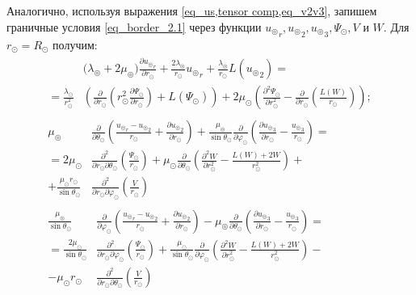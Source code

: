 Аналогично, используя выражения \cref{eq_us,tensor comp,eq_v2v3}, запишем граничные условия \cref{eq_border_2.1} через функции ${u_\circledcirc}_r, {u_\circledcirc}_2, {u_\circledcirc}_3, \Psi_\odot, V$ и $W.$ Для $r_\odot = R_\odot$ получим:
\begin{align}
\begin{split}
&\biggl(\lambda_\circledcirc+2\mu_\circledcirc\biggr)\frac{\partial {u_\circledcirc}_r}{\partial r_\odot} + \frac{2\lambda_\circledcirc}{r_\odot}{u_\circledcirc}_r + \frac{\lambda_\circledcirc}{r_\odot}L({u_\circledcirc}_2) = \\
= \frac{\lambda_\odot}{r_\odot^2}&\left(\frac{\partial}{\partial r_\odot}\left(r_\odot^2\frac{\partial\Psi_\odot}{\partial r_\odot}\right)+L(\Psi_\odot)\right) + 2\mu_\odot\left(\frac{\partial^2 \Psi_\odot}{\partial r_\odot^2} - \frac{\partial}{\partial r_\odot}\left(\frac{L(W)}{r_\odot}\right)\right);
\end{split}\label{eq_Rs.1}\\
\begin{split}
\mu_\circledcirc&\frac{\partial}{\partial \theta_\odot}\left(\frac{{u_\circledcirc}_r-{u_\circledcirc}_2}{r_\odot} + \frac{\partial {u_\circledcirc}_2}{\partial r_\odot}\right) + \frac{\mu_\circledcirc}{\sin\theta_\odot}\frac{\partial}{\partial \varphi_\odot}\left(\frac{\partial {u_\circledcirc}_3}{\partial r_\odot} - \frac{{u_\circledcirc}_3}{r_\odot}\right) = \\
= 2\mu_\odot&\frac{\partial^2}{\partial r_\odot\partial\theta_\odot}\left(\frac{\Psi_\odot}{r_\odot}\right)+ \mu_\odot\frac{\partial}{\partial\theta_\odot}\left(\frac{\partial^2 W}{\partial r_\odot^2} - \frac{L(W) + 2W}{r_\odot^2} \right) + \\
+ \frac{\mu_\odot r_\odot}{\sin\theta_\odot}&\frac{\partial^2}{\partial r_\odot\partial\varphi_\odot}\left(\frac{V}{r_\odot}\right)
\end{split}\label{eq_Rs.2}\\
\begin{split}
\frac{\mu_\circledcirc}{\sin\theta_\odot}&\frac{\partial}{\partial \varphi_\odot}\left(\frac{{u_\circledcirc}_r-{u_\circledcirc}_2}{r_\odot} + \frac{\partial {u_\circledcirc}_2}{\partial r_\odot}\right) - \mu_\circledcirc\frac{\partial}{\partial \theta_\odot}\left(\frac{\partial {u_\circledcirc}_3}{\partial r_\odot} - \frac{{u_\circledcirc}_3}{r_\odot}\right) = \\
= \frac{2\mu_\odot}{\sin\theta_\odot}&\frac{\partial^2}{\partial r_\odot\partial\varphi_\odot}\left(\frac{\Psi_\odot}{r_\odot}\right)+ \frac{\mu_\odot}{\sin\theta_\odot}\frac{\partial}{\partial\varphi_\odot}\left(\frac{\partial^2 W}{\partial r_\odot^2} - \frac{L(W) + 2W}{r_\odot^2} \right) - \\
- \mu_\odot r_\odot&\frac{\partial^2}{\partial r_\odot\partial\theta_\odot}\left(\frac{V}{r_\odot}\right)
\end{split}\label{eq_Rs.3}
\end{align}
